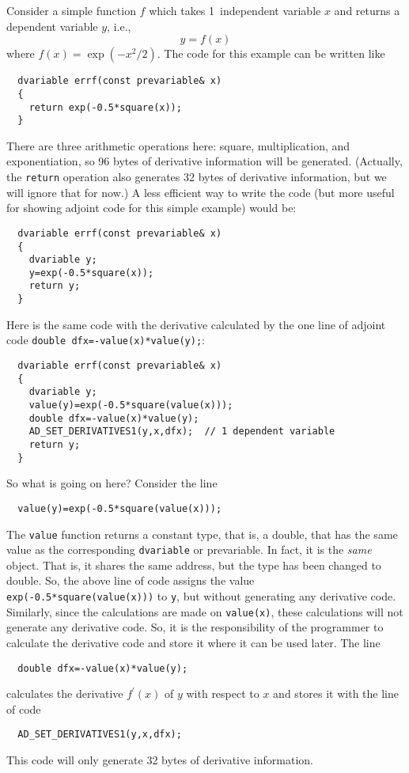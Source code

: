 Consider a simple function $f$ which takes 1~independent variable $x$
and returns a dependent variable $y$, i.e.,
$$y=f(x)$$
where $f(x)=\exp(-x^2/2)$. The code for this example can be written like
\begin{lstlisting}
  dvariable errf(const prevariable& x)
  {
    return exp(-0.5*square(x));
  }
\end{lstlisting}
There are three arithmetic operations here: square, multiplication, and exponentiation,
so 96 bytes of derivative information will be generated. (Actually, the \texttt{return} operation
also generates 32 bytes of derivative information, but we will ignore that for now.)
A less efficient way to write the code (but more useful for 
showing adjoint code for this simple example) would be:
\begin{lstlisting}
  dvariable errf(const prevariable& x)
  {
    dvariable y;
    y=exp(-0.5*square(x));
    return y;
  }
\end{lstlisting}
Here is the same code with the derivative calculated by the one line of adjoint
code \texttt{double dfx=-value(x)*value(y);}:
\begin{lstlisting}
  dvariable errf(const prevariable& x)
  {
    dvariable y;
    value(y)=exp(-0.5*square(value(x)));
    double dfx=-value(x)*value(y);
    AD_SET_DERIVATIVES1(y,x,dfx);  // 1 dependent variable 
    return y;
  }
\end{lstlisting}
So what is going on here? Consider the line
\begin{lstlisting}
  value(y)=exp(-0.5*square(value(x))); 
\end{lstlisting}
The \texttt{value} function returns a constant type, that is, a double, 
that has the same value as the corresponding \texttt{dvariable} or prevariable.
In fact, it is the {\it same} object.  That is, it shares the same address,
but the type has been changed to double. So, the above line of
code assigns the value \texttt{exp(-0.5*square(value(x)))} to \texttt{y},
but without generating any derivative code. Similarly, since
the calculations are made on \texttt{value(x)}, these calculations
will not generate any derivative code. So, it is the responsibility of the
programmer to calculate the derivative code and store it where it
can be used later. The line
\begin{lstlisting}
  double dfx=-value(x)*value(y);
\end{lstlisting}
calculates the derivative $f^\prime(x)$
of $y$ with respect to $x$ and stores it with the line of code
\begin{lstlisting}
  AD_SET_DERIVATIVES1(y,x,dfx);
\end{lstlisting}
This code will only generate 32 bytes of derivative information.


